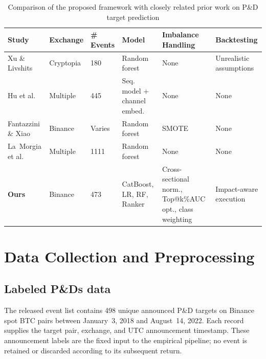 \documentclass{ieeeaccess}
\begin{document}
\begin{table}[!tbp]
    \centering
    \small
    \renewcommand{\arraystretch}{1.3}
    \setlength{\tabcolsep}{5pt}
    \caption{Comparison of the proposed framework with closely related prior work on P\&D target prediction}
    \begin{tabular}{p{2.8cm}p{2.2cm}p{2cm}p{2.2cm}p{2.5cm}p{2.5cm}}
        \toprule
        \textbf{Study} & \textbf{Exchange} & \textbf{\# Events} & \textbf{Model} & \textbf{Imbalance Handling} & \textbf{Backtesting} \\
        \midrule
        Xu \& Livshits~\cite{pd_anatomy} & Cryptopia & 180 & Random forest & None & Unrealistic assumptions \\
        Hu et al.~\cite{hu2023sequence} & Multiple & 445 & Seq. model + channel embed. & None & None \\
        Fantazzini \& Xiao~\cite{econometrics11030022} & Binance & Varies & Random forest & SMOTE & None \\
        La~Morgia et al.~\cite{la_morgia_pump_2020} & Multiple & 1111 & Random forest & None & None \\
        \textbf{Ours} & Binance & 473 & CatBoost, LR, RF, Ranker & Cross-sectional norm., Top@k\%AUC opt., class weighting & Impact-aware execution \\
        \bottomrule
    \end{tabular}
    \label{table:comparison_prior_work}
\end{table}

\section{Data Collection and Preprocessing}

\subsection{Labeled P\&Ds data}
\label{section:pump_and_dump_data}

The released event list contains 498 unique announced P\&D targets on Binance spot BTC pairs between January~3, 2018 and August~14, 2022. Each record supplies the target pair, exchange, and UTC announcement timestamp. These announcement labels are the fixed input to the empirical pipeline; no event is retained or discarded according to its subsequent return.
\end{document}
